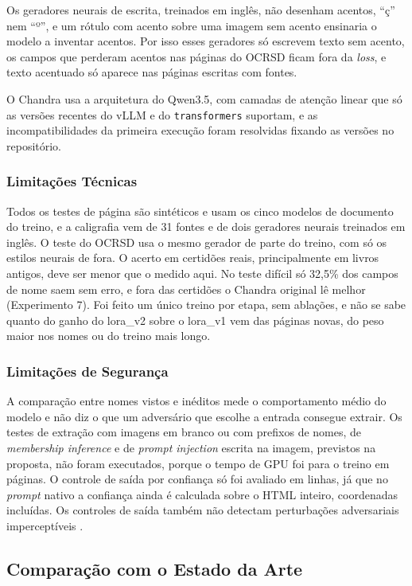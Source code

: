 Os geradores neurais de escrita, treinados em inglês, não desenham acentos, ``ç'' nem ``º'', e um rótulo com acento sobre uma imagem sem acento ensinaria o modelo a inventar acentos. Por isso esses geradores só escrevem texto sem acento, os campos que perderam acentos nas páginas do OCRSD ficam fora da \emph{loss}, e texto acentuado só aparece nas páginas escritas com fontes.

O Chandra usa a arquitetura do Qwen3.5, com camadas de atenção linear que só as versões recentes do vLLM e do \texttt{transformers} suportam, e as incompatibilidades da primeira execução foram resolvidas fixando as versões no repositório.

\subsubsection{Limitações Técnicas}
Todos os testes de página são sintéticos e usam os cinco modelos de documento do treino, e a caligrafia vem de 31 fontes e de dois geradores neurais treinados em inglês. O teste do OCRSD usa o mesmo gerador de parte do treino, com só os estilos neurais de fora. O acerto em certidões reais, principalmente em livros antigos, deve ser menor que o medido aqui. No teste difícil só 32,5\% dos campos de nome saem sem erro, e fora das certidões o Chandra original lê melhor (Experimento 7). Foi feito um único treino por etapa, sem ablações, e não se sabe quanto do ganho do lora\_v2 sobre o lora\_v1 vem das páginas novas, do peso maior nos nomes ou do treino mais longo.

\subsubsection{Limitações de Segurança}
A comparação entre nomes vistos e inéditos mede o comportamento médio do modelo e não diz o que um adversário que escolhe a entrada consegue extrair. Os testes de extração com imagens em branco ou com prefixos de nomes, de \emph{membership inference} e de \emph{prompt injection} escrita na imagem, previstos na proposta, não foram executados, porque o tempo de GPU foi para o treino em páginas. O controle de saída por confiança só foi avaliado em linhas, já que no \emph{prompt} nativo a confiança ainda é calculada sobre o HTML inteiro, coordenadas incluídas. Os controles de saída também não detectam perturbações adversariais imperceptíveis \cite{goodfellow2014}.

\subsection{Comparação com o Estado da Arte}

